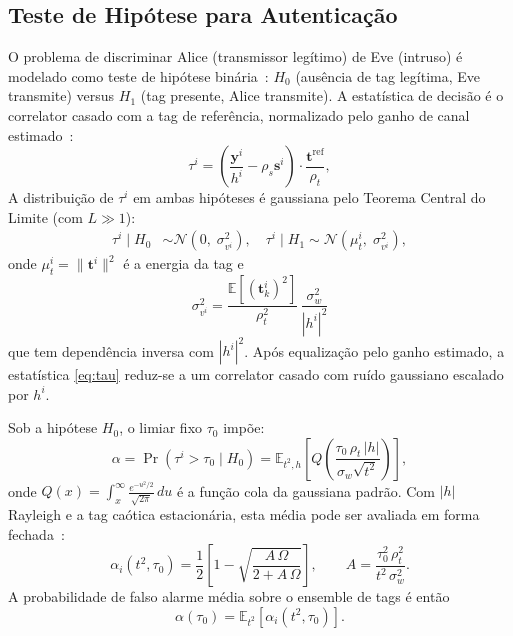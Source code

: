\documentclass[12pt,a4paper]{article}
\begin{document}
\subsection{Teste de Hipótese para Autenticação}\label{sec:hip}

O problema de discriminar Alice (transmissor legítimo) de Eve (intruso) é modelado como teste de hipótese binária~\cite{ref_poor}: $H_0$ (ausência de tag legítima, Eve transmite) versus $H_1$ (tag presente, Alice transmite). A estatística de decisão é o correlator casado com a tag de referência, normalizado pelo ganho de canal estimado~\cite{ref_xie}:
\begin{equation}\label{eq:tau}
    \tau^i = \left(\frac{\mathbf{y}^i}{h^i} - \rho_s \mathbf{s}^i\right) \cdot \frac{\mathbf{t}^{\mathrm{ref}}}{\rho_t},
\end{equation}
A distribuição de $\tau^i$ em ambas hipóteses é gaussiana pelo Teorema Central do Limite (com $L \gg 1$):
\begin{align}
    \tau^i \mid H_0 &\sim \mathcal{N}\!\left(0,\; \sigma_{v^i}^2\right),\quad
    \tau^i \mid H_1 \sim \mathcal{N}\!\left(\mu_{t}^i,\; \sigma_{v^i}^2\right), \label{eq:dists}
\end{align}
onde $\mu_t^i = \|\mathbf{t}^i\|^2$ é a energia da tag e
\begin{equation}\label{eq:var_v}
    \sigma_{v^i}^2 = \frac{\mathbb{E}[(\mathbf{t}^i_k)^2]}{\rho_t^2}\,\frac{\sigma_w^2}{|h^i|^2}
\end{equation}
que tem dependência inversa com $|h^i|^2$. Após equalização pelo ganho estimado, a estatística \eqref{eq:tau} reduz-se a um correlator casado com ruído gaussiano escalado por $h^i$.

Sob a hipótese $H_0$, o limiar fixo $\tau_0$ impõe:
\begin{equation}\label{eq:alpha_def}
    \alpha = \Pr(\tau^i > \tau_0 \mid H_0) = \mathbb{E}_{t^2,h}\left[Q\left(\frac{\tau_0\,\rho_t\,|h|}{\sigma_w\sqrt{t^2}}\right)\right],
\end{equation}
onde $Q(x)=\int_x^{\infty} \frac{e^{-u^2/2}}{\sqrt{2\pi}}\,du$ é a função cola da gaussiana padrão. Com $|h|$ Rayleigh e a tag caótica estacionária, esta média pode ser avaliada em forma fechada~\cite{ref_poor}:
\begin{equation}\label{eq:alpha_rayleigh_closed}
    \alpha_i(t^2,\tau_0) = \frac{1}{2}\left[1 - \sqrt{\frac{A\,\Omega}{2 + A\,\Omega}}\right],
    \qquad A = \frac{\tau_0^2\,\rho_t^2}{t^2\,\sigma_w^2}.
\end{equation}
A probabilidade de falso alarme média sobre o ensemble de tags é então
\begin{equation}\label{eq:alpha_avg}
    \alpha(\tau_0) = \mathbb{E}_{t^2}\left[\alpha_i(t^2,\tau_0)\right].
\end{equation}
\end{document}
